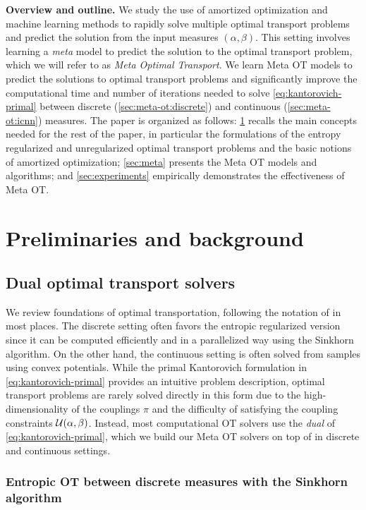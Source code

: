 \documentclass{article}
\begin{document}
\textbf{Overview and outline.}
We study the use of amortized optimization and machine learning
methods to rapidly solve multiple optimal transport problems
and predict the solution from the input measures $(\alpha, \beta)$.
This setting involves learning a \emph{meta} model
to predict the solution to the optimal transport problem,
which we will refer to as \emph{Meta Optimal Transport}.
We learn Meta OT models to predict the solutions to optimal
transport problems and significantly improve the computational
time and number of iterations needed to solve
\cref{eq:kantorovich-primal} between
discrete (\cref{sec:meta-ot:discrete}) and
continuous (\cref{sec:meta-ot:icnn}) measures. The paper is organized
as follows: \cref{sec:preliminaries_andback} recalls the main
concepts needed for the rest of the paper, in particular the
formulations of the entropy regularized and unregularized optimal
transport problems and the basic notions of amortized optimization;
\cref{sec:meta} presents the Meta OT models and algorithms; and
\cref{sec:experiments} empirically demonstrates the
effectiveness of Meta OT.

\section{Preliminaries and background}\label{sec:preliminaries_andback}
\subsection{Dual optimal transport solvers}
We review foundations of optimal transportation, following
the notation of \citet{peyre2019computational} in most places.
The discrete setting often favors the entropic
regularized version since it can be computed efficiently
and in a parallelized way using the Sinkhorn algorithm.
On the other hand, the continuous setting is often solved from
samples using convex potentials.
While the primal Kantorovich formulation in \cref{eq:kantorovich-primal}
provides an intuitive problem description, optimal transport problems
are rarely solved directly in this form due to the high-dimensionality
of the couplings $\pi$ and the difficulty of satisfying the
coupling constraints ${\mathcal{U}}(\alpha, \beta)$.
Instead, most computational OT solvers use the \emph{dual} of \cref{eq:kantorovich-primal},
which we build our
Meta OT solvers on top of in discrete and continuous settings.

\subsubsection{Entropic OT between discrete measures with the Sinkhorn algorithm}
\label{sec:prelim:discrete}
\end{document}
